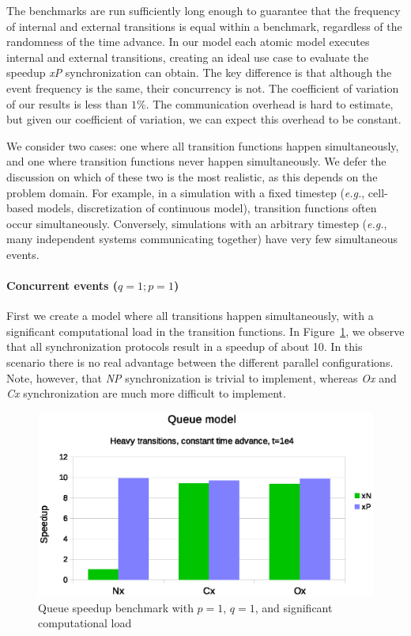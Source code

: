 The benchmarks are run sufficiently long enough to guarantee that the frequency of internal and external transitions is equal within a benchmark, regardless of the randomness of the time advance.
In our model each atomic model executes internal and external transitions, creating an ideal use case to evaluate the speedup \textit{xP} synchronization can obtain. 
The key difference is that although the event frequency is the same, their concurrency is not. 
The coefficient of variation of our results is less than $1\%$.
The communication overhead is hard to estimate, but given our coefficient of variation, we can expect this overhead to be constant.

We consider two cases: one where all transition functions happen simultaneously, and one where transition functions never happen simultaneously.
We defer the discussion on which of these two is the most realistic, as this depends on the problem domain.
For example, in a simulation with a fixed timestep (\textit{e.g.}, cell-based models, discretization of continuous model), transition functions often occur simultaneously.
Conversely, simulations with an arbitrary timestep (\textit{e.g.}, many independent systems communicating together) have very few simultaneous events.

\paragraph{Concurrent events ($q = 1; p = 1$)}
First we create a model where all transitions happen simultaneously, with a significant computational load in the transition functions.
In Figure~\ref{fig:psim_plot_fixed_sleep}, we observe that all synchronization protocols result in a speedup of about 10.  
In this scenario there is no real advantage between the different parallel configurations.
Note, however, that \textit{NP} synchronization is trivial to implement, whereas \textit{Ox} and \textit{Cx} synchronization are much more difficult to implement.

\begin{figure}
	\center
	\includegraphics[width=\columnwidth]{fig/pdevs_fixed_sleep.eps}
	\caption{Queue speedup benchmark with $p = 1$, $q = 1$, and significant computational load}
	\label{fig:psim_plot_fixed_sleep}
\end{figure}

